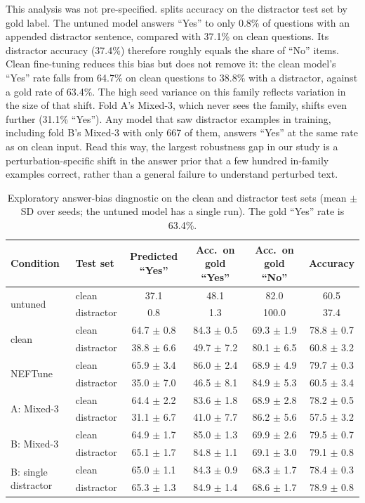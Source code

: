 \documentclass[11pt]{article}
\newcommand{\pfam}[1]{\textsf{#1}}
\begin{document}
This analysis was not pre-specified.  splits accuracy on the \pfam{distractor} test set by gold label. The untuned model answers ``Yes'' to only 0.8\% of questions with an appended distractor sentence, compared with 37.1\% on clean questions. Its \pfam{distractor} accuracy (37.4\%) therefore roughly equals the share of ``No'' items. Clean fine-tuning reduces this bias but does not remove it: the clean model's ``Yes'' rate falls from 64.7\% on clean questions to 38.8\% with a distractor, against a gold rate of 63.4\%. The high seed variance on this family reflects variation in the size of that shift. Fold A's Mixed-3, which never sees the family, shifts even further (31.1\% ``Yes''). Any model that saw \pfam{distractor} examples in training, including fold B's Mixed-3 with only 667 of them, answers ``Yes'' at the same rate as on clean input. Read this way, the largest robustness gap in our study is a perturbation-specific shift in the answer prior that a few hundred in-family examples correct, rather than a general failure to understand perturbed text.

\begin{table}[t]
\centering
\small
\caption{Exploratory answer-bias diagnostic on the clean and \pfam{distractor} test sets (mean $\pm$ SD over seeds; the untuned model has a single run). The gold ``Yes'' rate is 63.4\%.}
\label{tab:bias}
\begin{tabular}{@{}llcccc@{}}
\toprule
Condition & Test set & Predicted ``Yes'' & Acc.\ on gold ``Yes'' & Acc.\ on gold ``No'' & Accuracy \\
\midrule
\multirow{2}{*}{untuned} & clean & 37.1 & 48.1 & 82.0 & 60.5 \\
 & distractor & 0.8 & 1.3 & 100.0 & 37.4 \\
\multirow{2}{*}{clean} & clean & 64.7 $\pm$ 0.8 & 84.3 $\pm$ 0.5 & 69.3 $\pm$ 1.9 & 78.8 $\pm$ 0.7 \\
 & distractor & 38.8 $\pm$ 6.6 & 49.7 $\pm$ 7.2 & 80.1 $\pm$ 6.5 & 60.8 $\pm$ 3.2 \\
\multirow{2}{*}{NEFTune} & clean & 65.9 $\pm$ 3.4 & 86.0 $\pm$ 2.4 & 68.9 $\pm$ 4.9 & 79.7 $\pm$ 0.3 \\
 & distractor & 35.0 $\pm$ 7.0 & 46.5 $\pm$ 8.1 & 84.9 $\pm$ 5.3 & 60.5 $\pm$ 3.4 \\
\multirow{2}{*}{A: Mixed-3} & clean & 64.4 $\pm$ 2.2 & 83.6 $\pm$ 1.8 & 68.9 $\pm$ 2.8 & 78.2 $\pm$ 0.5 \\
 & distractor & 31.1 $\pm$ 6.7 & 41.0 $\pm$ 7.7 & 86.2 $\pm$ 5.6 & 57.5 $\pm$ 3.2 \\
\multirow{2}{*}{B: Mixed-3} & clean & 64.9 $\pm$ 1.7 & 85.0 $\pm$ 1.3 & 69.9 $\pm$ 2.6 & 79.5 $\pm$ 0.7 \\
 & distractor & 65.1 $\pm$ 1.7 & 84.8 $\pm$ 1.1 & 69.1 $\pm$ 3.0 & 79.1 $\pm$ 0.8 \\
\multirow{2}{*}{B: single \pfam{distractor}} & clean & 65.0 $\pm$ 1.1 & 84.3 $\pm$ 0.9 & 68.3 $\pm$ 1.7 & 78.4 $\pm$ 0.3 \\
 & distractor & 65.3 $\pm$ 1.3 & 84.9 $\pm$ 1.4 & 68.6 $\pm$ 1.7 & 78.9 $\pm$ 0.8 \\
\bottomrule
\end{tabular}
\end{table}
\end{document}

